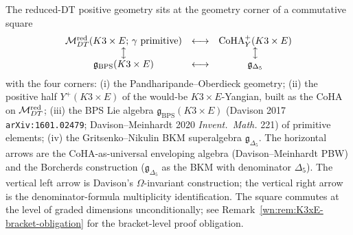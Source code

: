 \begin{remark}
\label{wn:rem:K3xE-four-corner}
The reduced-DT positive geometry sits at the geometry corner of a commutative square
\[
\begin{array}{ccc}
\mathcal{M}^{\mathrm{red}}_{DT}(K3 \times E;\, \gamma\text{ primitive}) & \longleftrightarrow & \mathrm{CoHA}^+_{Y}(K3 \times E) \\
\big\updownarrow & & \big\updownarrow \\
\mathfrak{g}_{\mathrm{BPS}}(K3 \times E) & \longleftrightarrow & \mathfrak{g}_{\Delta_5}
\end{array}
\]
with the four corners: (i) the Pandharipande--Oberdieck geometry; (ii) the positive
half $Y^+(K3 \times E)$ of the would-be $K3 \times E$-Yangian, built as the CoHA on
$\mathcal{M}^{\mathrm{red}}_{DT}$; (iii) the BPS Lie algebra $\mathfrak{g}_{\mathrm{BPS}}(K3 \times E)$
(Davison 2017 \texttt{arXiv:1601.02479}; Davison--Meinhardt 2020
\emph{Invent.\ Math.} 221) of primitive elements; (iv) the Gritsenko--Nikulin BKM
superalgebra $\mathfrak{g}_{\Delta_5}$. The horizontal arrows are the CoHA-as-universal
enveloping algebra (Davison--Meinhardt PBW) and the Borcherds construction
($\mathfrak{g}_{\Delta_5}$ as the BKM with denominator $\Delta_5$). The vertical left
arrow is Davison's $\Omega$-invariant construction; the vertical right arrow is the
denominator-formula multiplicity identification. The square commutes at the level of
graded dimensions unconditionally; see
Remark~\ref{wn:rem:K3xE-bracket-obligation} for the bracket-level proof obligation.
\end{remark}

